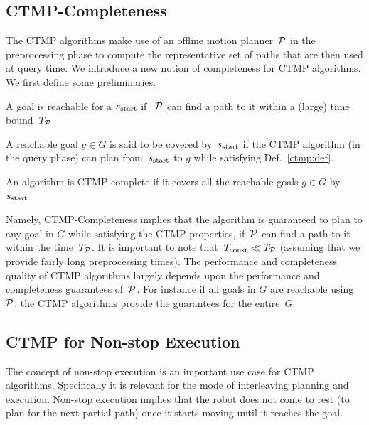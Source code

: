 \documentclass[a4paper]{report}
\begin{document}

\subsection{CTMP-Completeness}
The CTMP algorithms make use of an offline motion planner~$\mathcal{P}$ in the preprocessing phase to compute the representative set of paths that are then used at query time. We introduce a new notion of completeness for CTMP algorithms. We first define some preliminaries. 

\vspace{2mm}
\begin{definition}[Reachability]
\label{def:reachable}
A goal is reachable for a $s_{\textrm{start}}$  if~$~\mathcal{P}$ can find a path to it within a (large) time bound~$T_\textrm{\ensuremath{\mathcal{P}}}$ 
\end{definition}

\vspace{2mm}
\begin{definition}[Coverage]
\label{def:covered}
    A reachable goal $g \in G$ is said to be covered by~$s_{\text{start}}$ if the CTMP algorithm (in the query phase) can plan from~$s_{\text{start}}$ to $g$ while satisfying Def.~\ref{ctmp:def}.
\end{definition}

\vspace{2mm}
\begin{definition}
\label{def:complete}
    An algorithm is CTMP-complete if it covers all the reachable goals $g \in G$ by $s_{\textrm{start}}$
\end{definition}


Namely, CTMP-Completeness implies that the algorithm is guaranteed to plan to any goal in $G$ while satisfying the CTMP properties, if~$\mathcal{P}$ can find a path to it within the time~$T_\textrm{\ensuremath{\mathcal{P}}}$. It is important to note that~$T_\textrm{const} \ll T_\textrm{\ensuremath{\mathcal{P}}}$ (assuming that we provide fairly long preprocessing times). The performance and completeness quality of CTMP algorithms largely depends upon the performance and completeness guarantees of~$\mathcal{P}$. For instance if all goals in $G$ are reachable using~$\mathcal{P}$, the CTMP algorithms provide the guarantees for the entire~$G$.

\subsection{CTMP for Non-stop Execution}
The concept of non-stop execution is an important use case for CTMP algorithms. Specifically it is relevant for the mode of interleaving planning and execution. Non-stop execution implies that the robot does not come to rest (to plan for the next partial path) once it starts moving until it reaches the goal.
\end{document}
